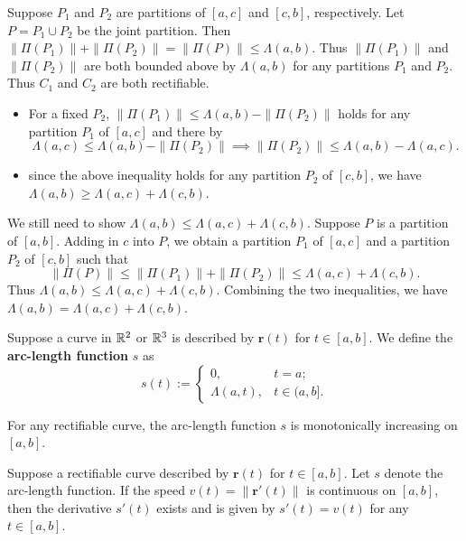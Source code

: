     \begin{proofenv}
        Suppose $P_1$ and $P_2$ are partitions of $[a,c]$ and $[c,b]$, respectively. Let $P = P_1 \cup P_2$ be the joint partition. Then $ \| \Pi (P_1)\| + \| \Pi (P_2)\| = \| \Pi (P)\| \le \Lambda(a,b)$. Thus $\| \Pi (P_1)\|$ and $\| \Pi (P_2)\|$ are both bounded above by $\Lambda(a,b)$ for any partitions $P_1$ and $P_2$. Thus $C_1$ and $C_2$ are both rectifiable.
        \begin{itemize}
            \item For a fixed $P_2$, $\| \Pi (P_1)\|  \le \Lambda(a,b) - \| \Pi (P_2)\|$ holds for any partition $P_1$ of $[a,c]$ and there by $$\Lambda(a,c) \le \Lambda(a,b) - \| \Pi (P_2)\| \implies \| \Pi (P_2) \| \le \Lambda(a,b) - \Lambda(a,c).$$
            \item since the above inequality holds for any partition $P_2$ of $[c,b]$, we have $\Lambda(a,b) \ge \Lambda(a,c) + \Lambda(c,b)$.
        \end{itemize}
        We still need to show $\Lambda(a,b) \le \Lambda(a,c) + \Lambda(c,b)$. Suppose $P$ is a partition of $[a,b]$. Adding in $c$ into $P$, we obtain a partition $P_1$ of $[a,c]$ and a partition $P_2$ of $[c,b]$ such that
        $$ \| \Pi (P)\| \le \| \Pi (P_1)\| + \| \Pi (P_2)\| \le \Lambda(a,c) + \Lambda(c,b). $$
        Thus $\Lambda(a,b) \le \Lambda(a,c) + \Lambda(c,b)$. Combining the two inequalities, we have $\Lambda(a,b) = \Lambda(a,c) + \Lambda(c,b)$.
    \end{proofenv}
    \begin{definitionenv}
        Suppose a curve in $\mathbb{R}^2$ or $\mathbb{R}^3$ is described by $\bm r(t)$ for $t\in [a,b]$. We define the \textbf{arc-length function} $s$ as
        $$ s(t) := \begin{cases}
            0, & t=a; \\
            \Lambda(a,t), & t\in (a,b].
        \end{cases}
        $$
    \end{definitionenv}
    \begin{theoremenv}
        For any rectifiable curve, the arc-length function $s$ is monotonically increasing on $[a,b]$.
    \end{theoremenv}
    \begin{theoremenv}
        Suppose a rectifiable curve described by $\bm r(t)$ for $t\in [a,b]$. Let $s$ denote the arc-length function. If the speed $v(t) = \| \bm r'(t)\|$ is continuous on $[a,b]$, then the derivative $s'(t)$ exists and is given by $s'(t) = v(t)$ for any $t\in [a,b]$.
    \end{theoremenv}
